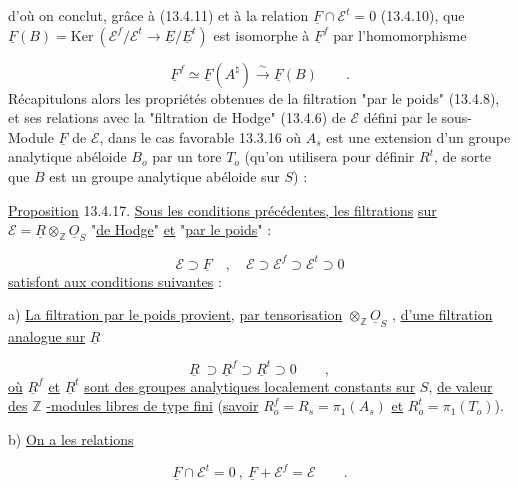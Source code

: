 
d'où on conclut, grâce à (13.4.11) et à la relation $\underline{F} \cap \mathcal{E}^t = 0$ (13.4.10), que $\underline{F}(B) = \mathrm{Ker}\ (\mathcal{E}^f/\mathcal{E}^t \longrightarrow \underline{E}/\underline{E}^t)$ est isomorphe à $\underline{F}^f$ par l'homomorphisme

\begin{equation}\tag{13.4.16}
\underline{F}^f \simeq \underline{F}(A^\natural) \overset{\sim}{\longrightarrow} \underline{F}(B) \qquad .
\end{equation}
Récapitulons alors les propriétés obtenues de la filtration "par le poids" (13.4.8), et ses relations avec la "filtration de Hodge" (13.4.6) de $\mathcal{E}$ défini par le sous-Module $\underline{F}$ de $\mathcal{E}$, dans le cas favorable 13.3.16 où $A_s$ est une extension d'un groupe analytique abéloide $B_o$ par un tore $T_o$ (qu'on utilisera pour définir $R^t$, de sorte que $B$ est un groupe analytique abéloide sur $S$) :

\underline{Proposition} 13.4.17. \underline{Sous les conditions précédentes, les filtrations} \underline{sur} $\mathcal{E} = \underline{R} \otimes_{\mathbb{Z}} \underline{O}_S$ "\underline{de Hodge}" \underline{et} "\underline{par le poids}" :

\begin{equation}\tag{13.4.17.1}
\mathcal{E} \supset \underline{F} \quad , \quad \mathcal{E} \supset \mathcal{E}^f \supset \mathcal{E}^t \supset 0
\end{equation}
\underline{satisfont aux conditions suivantes} :

a) \underline{La filtration par le poids provient,} \underline{par tensorisation} $\otimes_{\mathbb{Z}} \underline{O}_S$ , \underline{d'une filtration analogue sur} $\underline{R}$

\begin{equation*}
\underline{R} \ \supset \underline{R}^f \supset \underline{R}^t \supset 0 \qquad ,
\end{equation*}
\underline{où} $\underline{R}^f$ \underline{et} $\underline{R}^t$ \underline{sont des groupes analytiques localement constants sur} $S$, \underline{de valeur des} $\mathbb{Z}$ \underline{-modules libres de type fini} (\underline{savoir} $R_o^f = R_s = \pi_1(A_s)$ \underline{et} $R_o^t = \pi_1(T_o)$).

b) \underline{On a les relations}

\begin{equation}\tag{*}
\underline{F} \cap \mathcal{E}^t = 0 \ , \ \underline{F} + \mathcal{E}^f = \mathcal{E} \qquad .
\end{equation}

